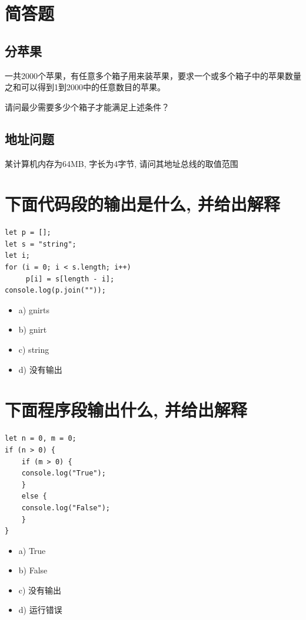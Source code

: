 \documentclass[11pt]{article}
\author{lin chuan}
\date{\today}
\title{}
\begin{document}
\tableofcontents

\section{简答题}
\label{sec:org67a7e40}
\subsection{分苹果}
\label{sec:org15c51dc}

一共2000个苹果，有任意多个箱子用来装苹果，要求一个或多个箱子中的苹果数量之和可以得到1到2000中的任意数目的苹果。

请问最少需要多少个箱子才能满足上述条件？
\subsection{地址问题}
\label{sec:org9a25ce6}

某计算机内存为64MB, 字长为4字节, 请问其地址总线的取值范围

\section{下面代码段的输出是什么, 并给出解释}
\label{sec:orgc2576ef}

\begin{verbatim}
let p = []; 
let s = "string"; 
let i; 
for (i = 0; i < s.length; i++) 
     p[i] = s[length - i]; 
console.log(p.join(""));
\end{verbatim}

\begin{itemize}
\item a) gnirts
\item b) gnirt
\item c) string
\item d) 没有输出
\end{itemize}

\section{下面程序段输出什么, 并给出解释}
\label{sec:org0946ef5}
\begin{verbatim}
let n = 0, m = 0;
if (n > 0) {
    if (m > 0) {
	console.log("True");
    }
    else {
	console.log("False");
    }
}
\end{verbatim}

\begin{itemize}
\item a) True
\item b) False
\item c) 没有输出
\item d) 运行错误
\end{itemize}
\end{document}
